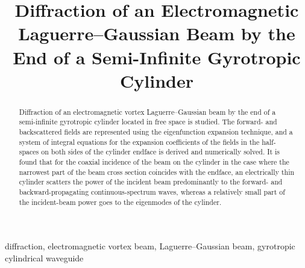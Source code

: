 \documentclass[conference,a4paper]{IEEEtran}
\begin{document}
\title{Diffraction of an Electromagnetic Laguerre--Gaussian Beam by the End of a Semi-Infinite Gyrotropic Cylinder}

\author{
\and
{}

}

\def\f{\phi}
\def\e{\varepsilon}
\newcommand{\cir}[1]{\mathop{#1}\limits^\circ}
\def\r{\rho}
\def\d{\textrm{d}}
\def\o{\omega}
\def\a{\alpha}
\def\b{\beta}
\def\PLG{P_{\rm LG}}
\def\a{\alpha}

\maketitle

\begin{abstract}
Diffraction of an electromagnetic vortex Laguerre--Gaussian beam by the end of a semi-infinite gyrotropic cylinder located in free space is studied. The forward- and backscattered fields are represented using the eigenfunction expansion technique, and a system of integral equations for the expansion coefficients of the fields in the half-spaces on both sides of the cylinder endface is derived and numerically solved. It is found that for the coaxial incidence of the beam on the cylinder in the case where the narrowest part of the beam cross section coincides with the endface, an electrically thin cylinder scatters the power of the incident beam predominantly to the forward- and backward-propagating continuous-spectrum waves, whereas a relatively small part of the incident-beam power goes to the eigenmodes of the cylinder.
\end{abstract}

\begin{IEEEkeywords}
diffraction, electromagnetic vortex beam, Laguerre--Gaussian beam, gyrotropic cylindrical waveguide
\end{IEEEkeywords}
\end{document}
